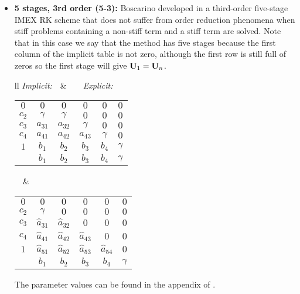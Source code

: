 \begin{itemize}
\begin{center}
\begin{tabular}{ll}
\begin{tabular}{c|ccccc}
$1/2$&$5/6$&$-5/6$&$1/2$&$0$&$0$\\
$1$&$1/4$&$7/4$&$3/4$&$-7/4$&$0$\\
\hline
&$1/4$&$7/4$&$3/4$&$-7/4$&$0$
\end{tabular}
\end{tabular}
\end{center}
\item \textbf{5 stages, 3rd order (5-3):}
Boscarino developed in \cite{boscarino_accurate_2009} a third-order five-stage IMEX RK scheme that does not suffer from order reduction phenomena when stiff problems containing a non-stiff term and a stiff term are solved. Note that in this case we say that the method has five stages because the first column of the implicit table is not zero, although the first row is still full of zeros so the first stage will give ${\bf U}_1={\bf U}_n$.
\begin{center}
\begin{tabular}{ll}
\textit{Implicit:}$\quad$&$\quad\quad$\textit{Explicit:}\\
\begin{tabular}{c|ccccc}
$0$&$0$&$0$&$0$&$0$&$0$\\
$c_2$&$\gamma$&$\gamma$&$0$&$0$&$0$\\
$c_3$&$a_{31}$&$a_{32}$&$\gamma$&$0$&$0$\\
$c_4$&$a_{41}$&$a_{42}$&$a_{43}$&$\gamma$&$0$\\
$1$&$b_1$&$b_2$&$b_3$&$b_4$&$\gamma$\\
\hline
&$b_1$&$b_2$&$b_3$&$b_4$&$\gamma$
\end{tabular}$\quad$&
$\quad\quad$\begin{tabular}{c|ccccc}
$0$&$0$&$0$&$0$&$0$&$0$\\
$c_2$&$\gamma$&$0$&$0$&$0$&$0$\\
$c_3$&$\hat{a}_{31}$&$\hat{a}_{32}$&$0$&$0$&$0$\\
$c_4$&$\hat{a}_{41}$&$\hat{a}_{42}$&$\hat{a}_{43}$&$0$&$0$\\
$1$&$\hat{a}_{51}$&$\hat{a}_{52}$&$\hat{a}_{53}$&$\hat{a}_{54}$&$0$\\
\hline
&$b_1$&$b_2$&$b_3$&$b_4$&$\gamma$
\end{tabular}
\end{tabular}
\end{center}
The parameter values can be found in the appendix of \cite{boscarino_accurate_2009}.
\end{itemize}